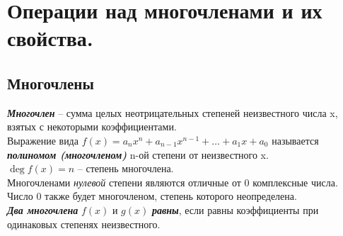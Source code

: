 \documentclass[12pt, fleqn]{article}
\begin{document}
\section{Операции над многочленами и их свойства.}
\subsection*{Многочлены}
\textit{\textbf{Многочлен}} -- сумма целых неотрицательных степеней неизвестного числа x, взятых с некоторыми коэффициентами.\\
Выражение вида $f(x)=a_nx^n+a_{n-1}x^{n-1}+\dots +a_1x+a_0$ называется \textit{\textbf{полиномом (многочленом)}} n-ой степени от неизвестного x.\\
$\deg f(x)=n$ -- степень многочлена.\\
Многочленами \textit{нулевой} степени являются отличные от 0 комплексные числа.\\
Число 0 также будет многочленом, степень которого неопределена.\\
\textit{\textbf{Два многочлена}} $f(x)$ и  $g(x)$ \textit{\textbf{равны}}, если равны коэффициенты при одинаковых степенях неизвестного.
\end{document}
